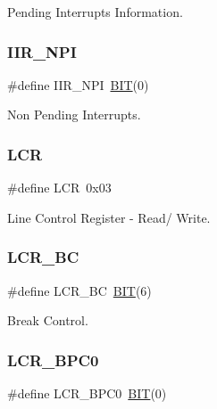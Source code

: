 Pending Interrupts Information. 

\hypertarget{group___serial_ga801f50fdaed5e1d41cc8606b06a4f993}{}\label{group___serial_ga801f50fdaed5e1d41cc8606b06a4f993} 
\subsubsection{\texorpdfstring{I\+I\+R\+\_\+\+N\+PI}{IIR\_NPI}}
{\footnotesize\ttfamily \#define I\+I\+R\+\_\+\+N\+PI~\hyperlink{group___serial_ga3a8ea58898cb58fc96013383d39f482c}{B\+IT}(0)}



Non Pending Interrupts. 

\hypertarget{group___serial_ga851cb396b6eaa97346364a772b439f37}{}\label{group___serial_ga851cb396b6eaa97346364a772b439f37} 
\subsubsection{\texorpdfstring{L\+CR}{LCR}}
{\footnotesize\ttfamily \#define L\+CR~0x03}



Line Control Register -\/ Read/ Write. 

\hypertarget{group___serial_ga896faa6ed28b750f3a5b9927ea12aedb}{}\label{group___serial_ga896faa6ed28b750f3a5b9927ea12aedb} 
\subsubsection{\texorpdfstring{L\+C\+R\+\_\+\+BC}{LCR\_BC}}
{\footnotesize\ttfamily \#define L\+C\+R\+\_\+\+BC~\hyperlink{group___serial_ga3a8ea58898cb58fc96013383d39f482c}{B\+IT}(6)}



Break Control. 

\hypertarget{group___serial_gae82a6d40fb6637ebdea0cf527594c3fc}{}\label{group___serial_gae82a6d40fb6637ebdea0cf527594c3fc} 
\subsubsection{\texorpdfstring{L\+C\+R\+\_\+\+B\+P\+C0}{LCR\_BPC0}}
{\footnotesize\ttfamily \#define L\+C\+R\+\_\+\+B\+P\+C0~\hyperlink{group___serial_ga3a8ea58898cb58fc96013383d39f482c}{B\+IT}(0)}



